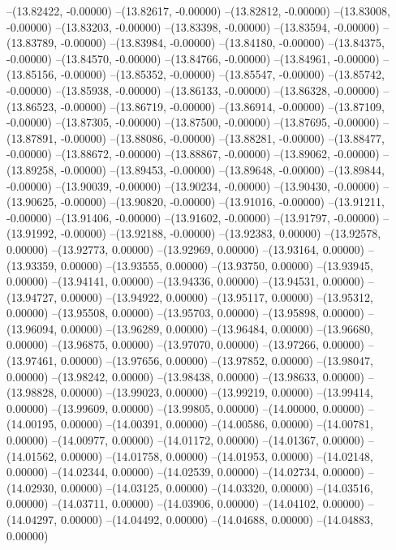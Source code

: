 --(13.82422, -0.00000)
--(13.82617, -0.00000)
--(13.82812, -0.00000)
--(13.83008, -0.00000)
--(13.83203, -0.00000)
--(13.83398, -0.00000)
--(13.83594, -0.00000)
--(13.83789, -0.00000)
--(13.83984, -0.00000)
--(13.84180, -0.00000)
--(13.84375, -0.00000)
--(13.84570, -0.00000)
--(13.84766, -0.00000)
--(13.84961, -0.00000)
--(13.85156, -0.00000)
--(13.85352, -0.00000)
--(13.85547, -0.00000)
--(13.85742, -0.00000)
--(13.85938, -0.00000)
--(13.86133, -0.00000)
--(13.86328, -0.00000)
--(13.86523, -0.00000)
--(13.86719, -0.00000)
--(13.86914, -0.00000)
--(13.87109, -0.00000)
--(13.87305, -0.00000)
--(13.87500, -0.00000)
--(13.87695, -0.00000)
--(13.87891, -0.00000)
--(13.88086, -0.00000)
--(13.88281, -0.00000)
--(13.88477, -0.00000)
--(13.88672, -0.00000)
--(13.88867, -0.00000)
--(13.89062, -0.00000)
--(13.89258, -0.00000)
--(13.89453, -0.00000)
--(13.89648, -0.00000)
--(13.89844, -0.00000)
--(13.90039, -0.00000)
--(13.90234, -0.00000)
--(13.90430, -0.00000)
--(13.90625, -0.00000)
--(13.90820, -0.00000)
--(13.91016, -0.00000)
--(13.91211, -0.00000)
--(13.91406, -0.00000)
--(13.91602, -0.00000)
--(13.91797, -0.00000)
--(13.91992, -0.00000)
--(13.92188, -0.00000)
--(13.92383, 0.00000)
--(13.92578, 0.00000)
--(13.92773, 0.00000)
--(13.92969, 0.00000)
--(13.93164, 0.00000)
--(13.93359, 0.00000)
--(13.93555, 0.00000)
--(13.93750, 0.00000)
--(13.93945, 0.00000)
--(13.94141, 0.00000)
--(13.94336, 0.00000)
--(13.94531, 0.00000)
--(13.94727, 0.00000)
--(13.94922, 0.00000)
--(13.95117, 0.00000)
--(13.95312, 0.00000)
--(13.95508, 0.00000)
--(13.95703, 0.00000)
--(13.95898, 0.00000)
--(13.96094, 0.00000)
--(13.96289, 0.00000)
--(13.96484, 0.00000)
--(13.96680, 0.00000)
--(13.96875, 0.00000)
--(13.97070, 0.00000)
--(13.97266, 0.00000)
--(13.97461, 0.00000)
--(13.97656, 0.00000)
--(13.97852, 0.00000)
--(13.98047, 0.00000)
--(13.98242, 0.00000)
--(13.98438, 0.00000)
--(13.98633, 0.00000)
--(13.98828, 0.00000)
--(13.99023, 0.00000)
--(13.99219, 0.00000)
--(13.99414, 0.00000)
--(13.99609, 0.00000)
--(13.99805, 0.00000)
--(14.00000, 0.00000)
--(14.00195, 0.00000)
--(14.00391, 0.00000)
--(14.00586, 0.00000)
--(14.00781, 0.00000)
--(14.00977, 0.00000)
--(14.01172, 0.00000)
--(14.01367, 0.00000)
--(14.01562, 0.00000)
--(14.01758, 0.00000)
--(14.01953, 0.00000)
--(14.02148, 0.00000)
--(14.02344, 0.00000)
--(14.02539, 0.00000)
--(14.02734, 0.00000)
--(14.02930, 0.00000)
--(14.03125, 0.00000)
--(14.03320, 0.00000)
--(14.03516, 0.00000)
--(14.03711, 0.00000)
--(14.03906, 0.00000)
--(14.04102, 0.00000)
--(14.04297, 0.00000)
--(14.04492, 0.00000)
--(14.04688, 0.00000)
--(14.04883, 0.00000)
